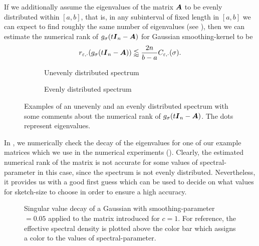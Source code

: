 If we additionally assume the eigenvalues of the matrix $\boldsymbol{A}$
to be evenly distributed within $[a, b]$, that is, in any subinterval of fixed length in
$[a, b]$ we can expect to find roughly the same number of eigenvalues (see ), then
we can estimate the numerical rank of $g_{\sigma}(t\boldsymbol{I}_n - \boldsymbol{A})$
for Gaussian \gls{smoothing-kernel} to be
\begin{equation}
    r_{\varepsilon, \cdot}(g_{\sigma}(t\boldsymbol{I}_n - \boldsymbol{A})) \lessapprox \frac{2 n}{b - a} C_{\varepsilon, \cdot}(\sigma).
    \label{equ:3-nystrom-kernel-numerical-rank-even-eigenvalues}
\end{equation}

\begin{figure}[ht]
    \centering
    \begin{subfigure}[t]{0.45\columnwidth}
        
        \caption{Unevenly distributed spectrum}
    \end{subfigure}
    \begin{subfigure}[t]{0.45\columnwidth}
        
        \caption{Evenly distributed spectrum}
    \end{subfigure}
    \caption{Examples of an unevenly and an evenly distributed spectrum
    with some comments about the numerical rank of $g_{\sigma}(t\boldsymbol{I}_n - \boldsymbol{A})$.
    The dots represent eigenvalues.}
    \label{fig:3-nystrom-evenly-distributed-spectrum}
\end{figure}

In , we numerically check the decay
of the eigenvalues for one of our example matrices which we use in the numerical
experiments (). Clearly, the estimated
numerical rank of the matrix is not accurate for some values of \gls{spectral-parameter}
in this case, since the spectrum is
not evenly distributed. Nevertheless, it provides us with a good first
guess which can be used to decide on what values for \gls{sketch-size} to choose
in order to ensure a high accuracy.\\
\begin{figure}[ht]
    \centering
    
    \caption{Singular value decay of a Gaussian 
       with \gls{smoothing-parameter} $=0.05$ applied to the matrix introduced
        for $c=1$. For reference,
       the effective spectral density is plotted above the color bar which
       assigns a color to the values of \gls{spectral-parameter}.}
    \label{fig:3-nystrom-singular-value-decay}
\end{figure}

